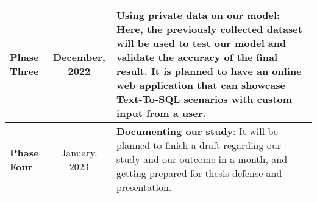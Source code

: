 \begin{tabular}{|l|c|p{9.5cm}|}
    \hline
    \textbf{Phase Three} & December, 2022                                                                      & \textbf{Using private data on our model}: Here, the previously collected dataset will be used to test our model and validate the accuracy of the final result. It is planned to have an online web application that can showcase Text-To-SQL scenarios with custom input from a user.                                                                                                                                                                                   \\
    \hline
    \textbf{Phase Four}  & January, 2023                                                                       & \textbf{Documenting our study}: It will be planned to finish a draft regarding our study and our outcome in a month, and getting prepared for thesis defense and presentation.                                                                                                                                                                                                                                                                                          \\
    \hline
\end{tabular}



